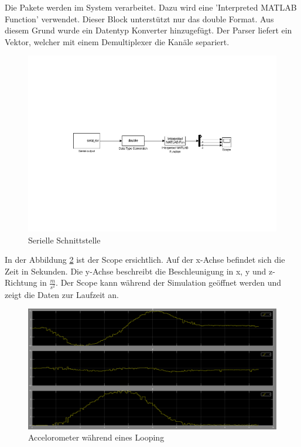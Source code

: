 \noindent
Die Pakete werden im System verarbeitet. Dazu wird eine 'Interpreted MATLAB Function' verwendet. Dieser Block unterstützt nur das double Format. Aus diesem Grund wurde ein Datentyp Konverter hinzugefügt. Der Parser liefert ein Vektor, welcher mit einem Demultiplexer die Kanäle separiert.
 \begin{figure}[ht]
  \begin{center}
  \includegraphics[scale=0.6, trim={5cm 9cm 4.8cm 8.5cm},clip]{pic/70_eigene_app/sys_main.pdf}
  \caption{Serielle Schnittstelle}
  \label{fig:main_sim_system}
  \end{center}
\end{figure}

\noindent
In der Abbildung \ref{fig:accel_looping} ist der Scope ersichtlich. Auf der x-Achse befindet sich die Zeit in Sekunden. Die y-Achse beschreibt die Beschleunigung in x, y und z-Richtung in $\frac{m}{s^2}$.  Der Scope kann während der Simulation geöffnet werden und zeigt die Daten zur Laufzeit an.
\begin{figure}[ht]
  \begin{center}
  \includegraphics[scale=0.3]{pic/70_eigene_app/looping.png}
  \caption{Accelorometer während eines Looping}
  \label{fig:accel_looping}
  \end{center}
\end{figure}






\clearpage
